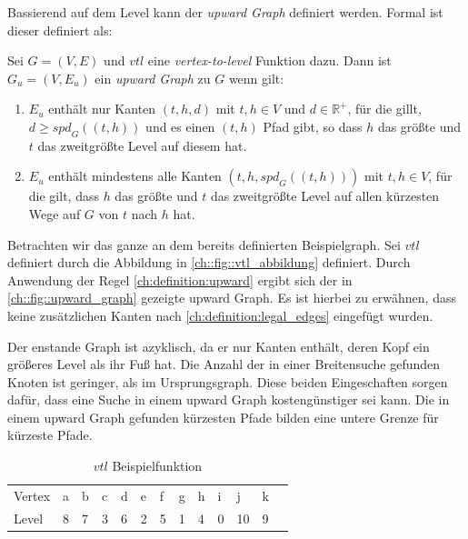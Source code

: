 Bassierend auf dem Level kann der \emph{upward Graph} definiert werden.
Formal ist dieser definiert als:

\begin{definition}
    Sei $G = (V, E)$ und ${vtl}$ eine \emph{vertex-to-level} Funktion dazu. Dann ist $G_u = (V, E_u)$ ein \emph{upward Graph} zu $G$ wenn gilt:
    \begin{enumerate}
        \item\label{ch:definition:legal_edges}
        $E_u$ enthält nur Kanten $(t, h, d)$ mit $t, h \in V$ und $d \in \mathbb{R}^+$, für die gillt, $d \geq {spd}_{G}((t, h))$ und es einen $(t, h)$ Pfad gibt, so dass $h$ das größte und $t$ das zweitgrößte Level auf diesem hat.

        \item\label{ch:definition:upward}
        $E_u$ enthält mindestens alle Kanten $(t, h, {spd}_{G}((t, h)))$ mit $t, h \in V$, für die gilt, dass $h$ das größte und $t$ das zweitgrößte Level auf allen kürzesten Wege auf $G$ von $t$ nach $h$ hat.
    \end{enumerate}
\end{definition}


Betrachten wir das ganze an dem bereits definierten Beispielgraph.
Sei ${vtl}$ definiert durch die Abbildung in \autoref{ch::fig::vtl_abbildung} definiert.
Durch Anwendung der Regel \ref{ch:definition:upward} ergibt sich der in \autoref{ch::fig::upward_graph} gezeigte upward Graph.
Es ist hierbei zu erwähnen, dass keine zusätzlichen Kanten nach \autoref{ch:definition:legal_edges} eingefügt wurden.

Der enstande Graph ist azyklisch, da er nur Kanten enthält, deren Kopf ein größeres Level als ihr Fuß hat.
Die Anzahl der in einer Breitensuche gefunden Knoten ist geringer, als im Ursprungsgraph.
Diese beiden Eingeschaften sorgen dafür, dass eine Suche in einem upward Graph kostengünstiger sei kann.
Die in einem upward Graph gefunden kürzesten Pfade bilden eine untere Grenze für kürzeste Pfade.

\begin{table}[ht]
    \centering
    \begin{tabular}{lllllllllllll}
        Vertex & a & b & c & d & e & f & g & h & i & j  & k & \\
        Level  & 8 & 7 & 3 & 6 & 2 & 5 & 1 & 4 & 0 & 10 & 9 &
    \end{tabular}
    \caption{${vtl}$ Beispielfunktion}
    \label{ch::fig::vtl_abbildung}
\end{table}


